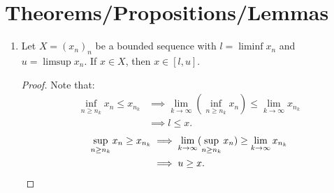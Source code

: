 \section*{Theorems/Propositions/Lemmas}
    \begin{enumerate}[label = (\arabic*)]
        \item Let $X = (x_n)_n$ be a bounded sequence with $l = \liminf x_n$ and $u = \limsup x_n$. If $x \in X$, then $x \in [l,u]$.
            {\color{red} \begin{proof}
                Note that:
                    \begin{equation*}
                    \begin{split}
                        \inf_{n \geq n_k}x_n \leq x_{n_k}
                        & \implies \lim_{k\rightarrow \infty}(\inf_{n \geq n_k}x_n) \leq \lim_{k \rightarrow \infty}x_{n_k} \\
                        & \implies l \leq x.
                    \end{split}
                    \end{equation*}
                    \begin{equation*}
                    \begin{split}
                        \sup_{n \geq n_k}x_n \geq x_{n_k}
                        & \implies \lim_{k\rightarrow \infty}(\sup_{n \geq n_k}x_n) \geq \lim_{k \rightarrow \infty}x_{n_k} \\
                        & \implies u \geq x. \qedhere
                    \end{split}
                    \end{equation*}
            \end{proof}}


\end{enumerate}
